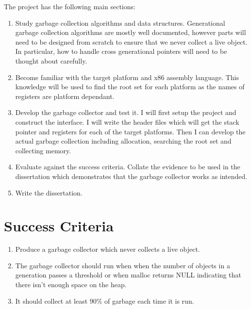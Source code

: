 \documentclass[12pt, a4]{article}
\begin{document}
The project has the following main sections:

\begin{enumerate}

	\item Study garbage collection algorithms and data structures. Generational garbage collection algorithms are mostly well documented, however parts will need to be designed from scratch to ensure that we never collect a live object. In particular, how to handle cross generational pointers will need to be thought about carefully.

	\item Become familiar with the target platform and x86 assembly language. This knowledge will be used to find the root set for each platform as the names of registers are platform dependant.
	
	\item Develop the garbage collector and test it. I will first setup the project and construct the interface. I will write the header files which will get the stack pointer and registers for each of the target platforms. Then I can develop the actual garbage collection including allocation, searching the root set and collecting memory.
	
	\item Evaluate against the success criteria. Collate the evidence to be used in the dissertation which demonstrates that the garbage collector works as intended.
	
	\item Write the dissertation.

\end{enumerate}

\section*{Success Criteria}

\begin{enumerate}
	
	\item Produce a garbage collector which never collects a live object.
	
	\item The garbage collector should run when when the number of objects in a generation passes a threshold or when malloc returns NULL indicating that there isn't enough space on the heap.
	
	\item It should collect at least 90\% of garbage each time it is run.
	
\end{enumerate}
\end{document}
